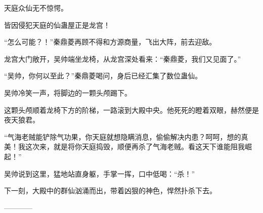 \begin{this_body}
天庭众仙无不惊愕。

皆因侵犯天庭的仙蛊屋正是龙宫！

“怎么可能？！”秦鼎菱再顾不得和方源商量，飞出大阵，前去迎敌。

龙宫大门敞开，吴帅端坐龙椅，从龙宫深处看来：“秦鼎菱，我们又见面了。”

“吴帅，你何以至此？”秦鼎菱喝问，身后已经汇集了数位蛊仙。

吴帅冷笑一声，将脚边的一颗头颅踢下。

这颗头颅顺着龙椅下方的阶梯，一路滚到大殿中央。他死死的瞪着双眼，赫然便是夜天狼君。

“气海老贼能铲除气功果，你天庭就想隐瞒消息，偷偷解决内患？呵呵，想的真美！我这次来，就是将你天庭捣毁，顺便再杀了气海老贼。看这天下谁能阻我崛起！”

吴帅说到这里，猛地站直身躯，手掌一挥，口中低喝：“杀！”

下一刻，大殿中的群仙汹涌而出，带着凶狠的神色，悍然扑杀下去。

------------

\end{this_body}

